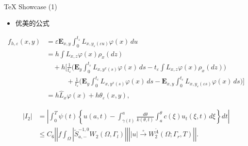 \documentclass[dvipsnames, svgnames, mode=present, paper=screen, size=9pt,
style=husky]{powerdot}
\newcommand{\wt}{\widetilde}
\newcommand{\wh}{\widehat}
\newcommand{\envert}[1]{\left\lvert#1\right\rvert}
\let\abs=\envert
\begin{document}
\begin{CJK*}{GBK}{song}
\begin{slide}{\TeX{} Showcase (1)}
  \begin{itemize}
  \item 优美的公式
  \end{itemize}
  \begin{equation}
\begin{split}
f_{h,\varepsilon}(x,y)
&=\varepsilon\mathbf{E}_{x,y}\int_0^{t_\varepsilon}
L_{x,y_\varepsilon(\varepsilon u)}\varphi(x)\,du\\
&= h\int L_{x,z}\varphi(x)\rho_x(dz)\\
&\quad+h\biggl[\frac{1}{t_\varepsilon}\biggl(\mathbf{E}_{y}
  \int_0^{t_\varepsilon}L_{x,y^x(s)}\varphi(x)\,ds
  -t_\varepsilon\int L_{x,z}\varphi(x)\rho_x(dz)\biggr)\\
&\phantom{{=}+h\biggl[}+\frac{1}{t_\varepsilon}
  \biggl(\mathbf{E}_{y}\int_0^{t_\varepsilon}L_{x,y^x(s)}
    \varphi(x)\,ds -\mathbf{E}_{x,y}\int_0^{t_\varepsilon}
   L_{x,y_\varepsilon(\varepsilon s)}
   \varphi(x)\,ds\biggr)\biggr]\\
&=h\wh{L}_x\varphi(x)+h\theta_\varepsilon(x,y),
\end{split}
\end{equation} 

\begin{equation}
\begin{split}
 \abs{I_2}&=\left\lvert \int_{0}^T \psi(t)\left\{u(a,t)-\int_{\gamma(t)}^a
  \frac{d\theta}{k(\theta,t)}
  \int_{a}^\theta c(\xi)u_t(\xi,t)\,d\xi\right\}dt\right\rvert\\
&\le C_6\left\lvert \left\lvert f\int_\Omega\left\lvert \wt{S}^{-1,0}_{a,-}
  W_2(\Omega,\Gamma_l)\right\rvert\right\rvert
  \left\lvert \abs{u}\overset{\circ}\to W_2^{\wt{A}}
  (\Omega;\Gamma_r,T)\right\rvert\right\rvert.
\end{split}
\end{equation}
\end{slide}


\end{CJK*}
\end{document}
